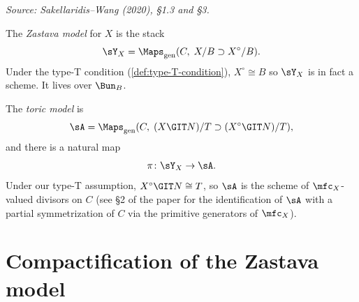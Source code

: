 \begin{definition}
  \label{def:zastava-model}
%
  \textit{Source: Sakellaridis--Wang (2020), §1.3 and §3.}

  The \emph{Zastava model} for \( X \) is the stack
  \[
    \sY_X = \Maps_{\mathrm{gen}}(C,\; X/B \supset X^\circ/B).
  \]
  Under the type-T condition (\cref{def:type-T-condition}), \( X^\circ \cong B \) so
  \( \sY_X \) is in fact a scheme.  It lives over \( \Bun_B \).

  The \emph{toric model} is
  \[
    \sA = \Maps_{\mathrm{gen}}(C,\; (X \GIT N)/T \supset (X^\circ \GIT N)/T),
  \]
  and there is a natural map
  \[
    \pi \colon \sY_X \to \sA.
  \]
  Under our type-T assumption, \( X^\circ \GIT N \cong T \), so \( \sA \) is the scheme of
  \( \mfc_X \)-valued divisors on \( C \) (see §2 of the paper for the identification of
  \( \sA \) with a partial symmetrization of \( C \) via the primitive generators
  of \( \mfc_X \)).
\end{definition}


\section{Compactification of the Zastava model}

